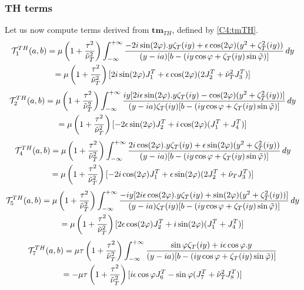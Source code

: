 \subsubsection{TH terms}
Let us now compute terms derived from $\mathbf{tm}_{TH}$, defined by \eqref{C4:tmTH}.
\begin{multline}
\mathcal{T}_1^{TH}(a,b)=\mu\left(1+\frac{\tau^2}{\nuti_T^2}\right)\int_{-\infty}^{+\infty} \frac{-2i\sin(2\varphi).y\zeta_T(iy)+\epsilon \cos (2\varphi)(y^2+\zeta_T^2(iy))}{(y-ia)\lbrack b-(iy\cos \varphi+ \zeta_T(iy)\sin\phiti) \rbrack} \, dy \\
\hfill=\mu\left(1+\frac{\tau^2}{\nuti_T^2}\right) \lbrack 2i\sin(2\varphi)J_1^T+\epsilon\cos(2\varphi)(2J_2^T+\nuti_T^2 J_3^T)\rbrack \hfill
\end{multline}
\begin{multline}
\mathcal{T}_2^{TH}(a,b)=\mu\left(1+\frac{\tau^2}{\nuti_T^2}\right)\int_{-\infty}^{+\infty} \frac{iy\lbrack 2i\epsilon \sin(2\varphi).y\zeta_T(iy)- \cos (2\varphi)(y^2+\zeta_T^2(iy))\rbrack}{(y-ia)\zeta_T(iy)\lbrack b-(iy\cos \varphi+ \zeta_T(iy)\sin\phiti) \rbrack} \, dy \\
\hfill= \mu\left(1+\frac{\tau^2}{\nuti_T^2}\right) \lbrack -2\epsilon\sin(2\varphi)J_2^T+i\cos(2\varphi)(J_1^T+J_4^T) \rbrack \hfill
\end{multline}
\begin{multline}
\mathcal{T}_4^{TH}(a,b)=\mu\left(1+\frac{\tau^2}{\nuti_T^2}\right)\int_{-\infty}^{+\infty} \frac{2i\cos(2\varphi).y\zeta_T(iy)+\epsilon \sin (2\varphi)(y^2+\zeta_T^2(iy))}{(y-ia)\lbrack b-(iy\cos \varphi+ \zeta_T(iy)\sin\phiti) \rbrack} \, dy \\
\hfill =\mu\left(1+\frac{\tau^2}{\nuti_T^2}\right) \lbrack -2i\cos(2\varphi)J_1^T+\epsilon \sin(2\varphi)(2J_2^T+\nuti_TJ_3^T) \rbrack \hfill
\end{multline}
\begin{multline}
\mathcal{T}_5^{TH}(a,b)=\mu\left(1+\frac{\tau^2}{\nuti_T^2}\right)\int_{-\infty}^{+\infty} \frac{-iy\lbrack 2i\epsilon \cos(2\varphi).y\zeta_T(iy)+\sin (2\varphi)(y^2+\zeta_T^2(iy))\rbrack}{(y-ia)\zeta_T(iy)\lbrack b-(iy\cos \varphi+ \zeta_T(iy)\sin\phiti) \rbrack} \, dy \\
\hfill =\mu\left(1+\frac{\tau^2}{\nuti_T^2}\right) \lbrack 2\epsilon\cos(2\varphi)J_2^T+i\sin(2\varphi)(J_1^T+J_4^T)\rbrack \hfill
\end{multline}
\begin{multline}
\mathcal{T}_7^{TH}(a,b)=\mu\tau\left(1+\frac{\tau^2}{\nuti_T^2}\right)\int_{-\infty}^{+\infty} \frac{\sin\varphi\zeta_T(iy)+i\epsilon\cos\varphi.y}{(y-ia)\lbrack b-(iy\cos \varphi+ \zeta_T(iy)\sin\phiti) \rbrack} \\
\hfill = -\mu\tau\left(1+\frac{\tau^2}{\nuti_T^2}\right)\lbrack i\epsilon\cos\varphi J_6^T-\sin\varphi(J_7^T+\nuti_T^2J_8^T)\rbrack \hfill
\end{multline}
